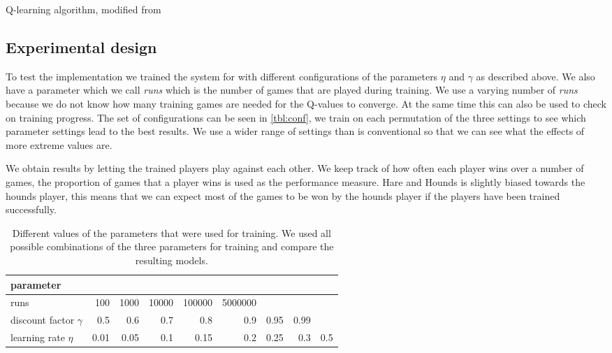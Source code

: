 \begin{algorithm}
\caption{Q-learning algorithm, modified from \cite{alpaydin}}
\label{alg:Qlearning}
\begin{algorithmic}[1]
	\Repeat
\EndFor
\end{algorithmic}
\end{algorithm}

\subsection{Experimental design}
To test the implementation we trained the system for with different
configurations of the parameters $\eta$ and $\gamma$ as described above. We
also have a parameter which we call \emph{runs} which is the number of games
that are played during training. We use a varying number of \emph{runs}
because we do not know how many training games are needed for the Q-values to
converge. At the same time this can also be used to check on training progress.
The set of configurations can be seen in \autoref{tbl:conf}, we train on each
permutation of the three settings to see which parameter settings lead to the
best results. We use a wider range of settings than is conventional so that we
can see what the effects of more extreme values are.

We obtain results by letting the trained players play against each other. We
keep track of how often each player wins over a number of games, the
proportion of games that a player wins is used as the performance measure. Hare
and Hounds is slightly biased towards the hounds player, this means that we can
expect most of the games to be won by the hounds player if the players have
been trained successfully.

\begin{table}
    \centering
    \caption{Different values of the parameters that were used for training.
    	We used all possible combinations of the three parameters for training
    	and compare the resulting models.}
    \label{tbl:conf}
    \begin{tabular}{l|rrrrrrrr}
        \hline
        parameter & \\
        \hline
        runs & 100 & 1000 & 10000 & 100000 & 5000000 \\
        discount factor $\gamma$ & 0.5 & 0.6 & 0.7 & 0.8 & 0.9 & 0.95 &
        0.99 \\
        learning rate $\eta$ & 0.01 & 0.05 & 0.1 & 0.15 & 0.2 & 0.25 & 0.3
        & 0.5 \\
        \hline
    \end{tabular}
\end{table}
